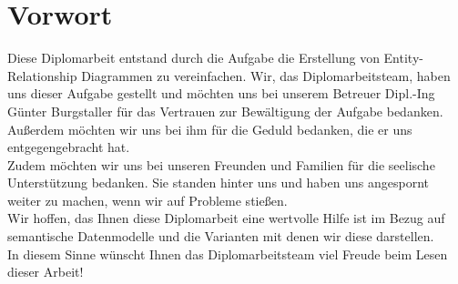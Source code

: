 \chapter{Vorwort}
\label{cha:Vorwort}
Diese Diplomarbeit entstand durch die Aufgabe die Erstellung von Entity-Relationship Diagrammen zu vereinfachen. Wir, das Diplomarbeitsteam, haben uns dieser Aufgabe gestellt und möchten uns bei unserem Betreuer Dipl.-Ing Günter Burgstaller für das Vertrauen zur Bewältigung der Aufgabe bedanken. Außerdem möchten wir uns bei ihm für die Geduld bedanken, die er uns entgegengebracht hat.
\\

\noindent
Zudem möchten wir uns bei unseren Freunden und Familien für die seelische Unterstützung bedanken. Sie standen hinter uns und haben uns angespornt weiter zu machen, wenn wir auf Probleme stießen.
\\

\noindent
Wir hoffen, das Ihnen diese Diplomarbeit eine wertvolle Hilfe ist im Bezug auf semantische Datenmodelle und die Varianten mit denen wir diese darstellen.
\\

\noindent
In diesem Sinne wünscht Ihnen das Diplomarbeitsteam viel Freude beim Lesen dieser Arbeit!



